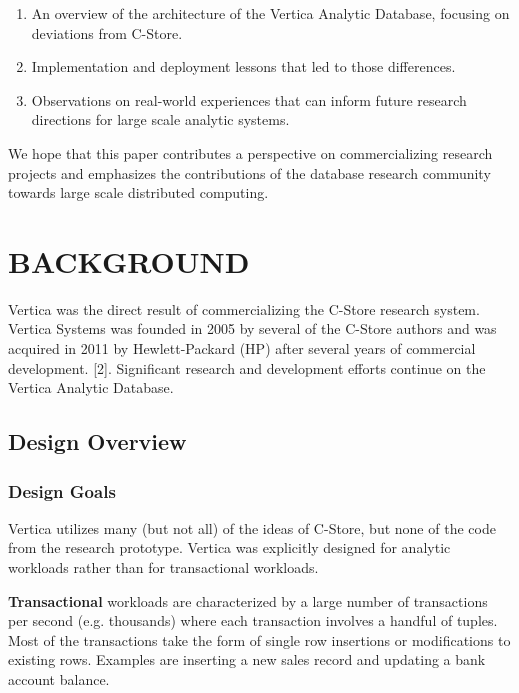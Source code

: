 \documentclass[a4paper,12pt,notitlepage,twoside,openright]{article}
\begin{document}
\begin{enumerate}
\def\labelenumi{\arabic{enumi}.}
\item
  An overview of the architecture of the Vertica Analytic Database,
  focusing on deviations from C-Store.
\item
  Implementation and deployment lessons that led to those differences.
\item
  Observations on real-world experiences that can inform future research
  directions for large scale analytic systems.
\end{enumerate}

We hope that this paper contributes a perspective on commercializing
research projects and emphasizes the contributions of the database
research community towards large scale distributed computing.

\hypertarget{background}{%
\section{BACKGROUND}\label{background}}

Vertica was the direct result of commercializing the C-Store research
system. Vertica Systems was founded in 2005 by several of the C-Store
authors and was acquired in 2011 by Hewlett-Packard (HP) after several
years of commercial development. {[}2{]}. Significant research and
development efforts continue on the Vertica Analytic Database.

\hypertarget{design-overview}{%
\subsection{Design Overview}\label{design-overview}}

\hypertarget{design-goals}{%
\subsubsection{Design Goals}\label{design-goals}}

Vertica utilizes many (but not all) of the ideas of C-Store, but none of
the code from the research prototype. Vertica was explicitly designed
for analytic workloads rather than for transactional workloads.

\textbf{Transactional} workloads are characterized by a large number of
transactions per second (e.g. thousands) where each transaction involves
a handful of tuples. Most of the transactions take the form of single
row insertions or modifications to existing rows. Examples are inserting
a new sales record and updating a bank account balance.
\end{document}

